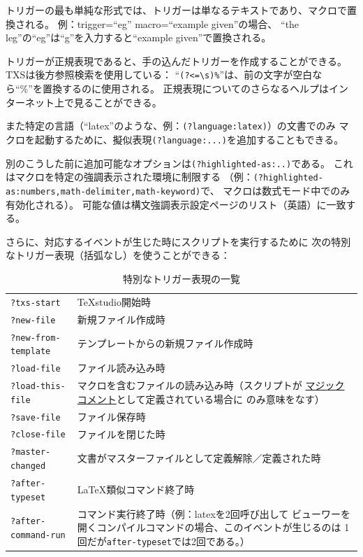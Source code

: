 トリガーの最も単純な形式では、トリガーは単なるテキストであり、マクロで置換される。
例：trigger=``eg'' macro=``example given''の場合、
``the leg''の``eg''は``g''を入力すると``example given''で置換される。

トリガーが正規表現であると、手の込んだトリガーを作成することができる。
TXSは後方参照検索を使用している：
``\verb+(?<=\s)%+''は、前の文字が空白なら``\%''を置換するのに使用される。
正規表現についてのさらなるヘルプはインターネット上で見ることができる。

また特定の言語（``latex''のような、例：\verb+(?language:latex)+）の文書でのみ
マクロを起動するために、擬似表現\verb+(?language:...)+を追加することもできる。

別のこうした前に追加可能なオプションは\verb+(?highlighted-as:..)+である。
これはマクロを特定の強調表示された環境に制限する
（例：\verb+(?highlighted-as:numbers,math-delimiter,math-keyword)+で、
マクロは数式モード中でのみ有効化される）。
可能な値は構文強調表示設定ページのリスト（英語）に一致する。

さらに、対応するイベントが生じた時にスクリプトを実行するために
次の特別なトリガー表現（括弧なし）を使うことができる：

\begin{table}[H]
  \centering
  \caption{特別なトリガー表現の一覧}
  \begin{tabularx}{\linewidth}{lX}
    \hline
    \texttt{?txs-start} & TeXstudio開始時\\
    \texttt{?new-file} & 新規ファイル作成時\\
    \texttt{?new-from-template} & テンプレートからの新規ファイル作成時\\
    \texttt{?load-file} & ファイル読み込み時\\
    \texttt{?load-this-file}
      & マクロを含むファイルの読み込み時（スクリプトが
      \hyperref[sec:magiccomment]{マジックコメント}として定義されている場合に
      のみ意味をなす）\\
    \texttt{?save-file} & ファイル保存時\\
    \texttt{?close-file} & ファイルを閉じた時\\
    \texttt{?master-changed} & 文書がマスターファイルとして定義解除／定義された時\\
    \texttt{?after-typeset} & LaTeX類似コマンド終了時\\
    \texttt{?after-command-run}
      & コマンド実行終了時（例：latexを2回呼び出して
      ビューワーを開くコンパイルコマンドの場合、このイベントが生じるのは
      1回だが\texttt{after-typeset}では2回である。）\\
    \hline
  \end{tabularx}
\end{table}

